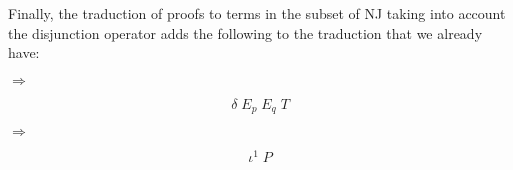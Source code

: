 \documentclass{article}
\begin{document}
\begin{mathpar}
\end{mathpar}

\begin{minipage}[t][2cm][t]{.4\textwidth}
\begin{mathpar}
\end{mathpar}
\end{minipage}
\hfill
\begin{minipage}[t]{.4\textwidth}
\begin{mathpar}
\end{mathpar}
\end{minipage}

Finally, the traduction of proofs to terms in the subset 
of NJ taking into account the disjunction operator adds 
the following to the traduction that we already have:

\begin{minipage}[c][2cm][c]{.4\textwidth}
\begin{mathpar}
\end{mathpar}
\end{minipage}
$\Longrightarrow$
\begin{minipage}[c]{.4\textwidth}
$$\delta\;E_p\;E_q\;T$$
\end{minipage}

\begin{minipage}[c][2cm][c]{.4\textwidth}
\begin{mathpar}
\end{mathpar}
\end{minipage}
$\Longrightarrow$
\begin{minipage}[c]{.4\textwidth}
$$\iota^1\;P$$
\end{minipage}
\end{document}

